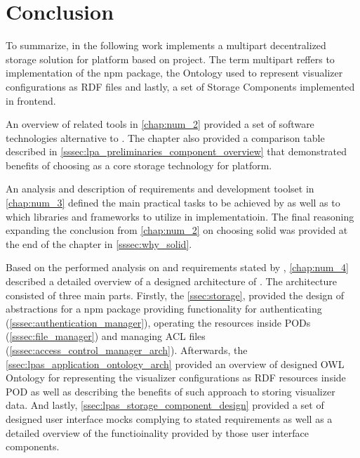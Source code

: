 \chapter*{Conclusion}

To summarize, in the following work implements a multipart decentralized storage solution for \lpa{} platform based on \solid{} project. The term multipart reffers to implementation of the \lpas{} npm package, the \lpas{} Ontology used to represent \lpa{} visualizer configurations as RDF files and lastly, a set of Storage Components implemented in \lpa{} frontend. 

An overview of related tools in \autoref{chap:num_2} provided a set of software technologies alternative to \solid{}. The chapter also provided a comparison table described in \autoref{sssec:lpa_preliminaries_component_overview} that demonstrated benefits of choosing \solid{} as a core storage technology for \lpa{} platform.

An analysis and description of \lpa{} requirements and \solid{} development toolset in \autoref{chap:num_3} defined the main practical tasks to be achieved by \lpas{} as well as to which \solid{} libraries and frameworks to utilize in implementatioin. The final reasoning expanding the conclusion from \autoref{chap:num_2} on choosing solid was provided at the end of the chapter in \autoref{sssec:why_solid}.

Based on the performed analysis on \solid{} and requirements stated by \lpa{}, \autoref{chap:num_4} described a detailed overview of a designed architecture of \lpas{}. The architecture consisted of three main parts. Firstly, the \autoref{ssec:storage}, provided the design of abstractions for a \lpas{} npm package providing functionality for authenticating (\autoref{sssec:authentication_manager}), operating the resources inside \solid{} PODs (\autoref{sssec:file_manager}) and managing ACL files (\autoref{sssec:access_control_manager_arch}). Afterwards, the \autoref{ssec:lpas_application_ontology_arch} provided an overview of designed OWL Ontology for representing the \lpa{} visualizer configurations as RDF resources inside \solid{} POD as well as describing the benefits of such approach to storing visualizer data. And lastly, \autoref{ssec:lpas_storage_component_design} provided a set of designed user interface mocks complying to stated \lpa{} requirements as well as a detailed overview of the functioinality provided by those user interface components.

